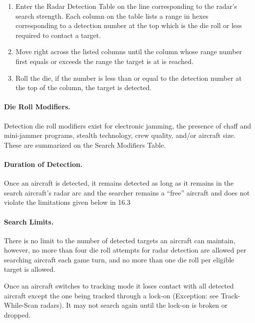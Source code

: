 \begin{enumerate}
    \item Enter the Radar Detection Table on the line corresponding to the radar's search strength. Each column on the table lists a range in hexes corresponding to a detection number at the top which is the die roll or less required to contact a target.
    \item Move right across the listed columns until the column whose range number first equals or exceeds the range the target is at is reached.
    \item Roll the die, if the number is less than or equal to the detection number at the top of the column, the target is detected.
\end{enumerate}

\paragraph{Die Roll Modifiers.} Detection die roll modifiers exist for electronic jamming, the presence of chaff and mini-jammer programs, stealth technology, crew quality, and/or aircraft size. These are summarized on the Search Modifiers Table.

\paragraph{Duration of Detection.} Once an aircraft is detected, it remains detected as long as it remains in the search aircraft's radar arc and the searcher remains a “free” aircraft and does not violate the limitations given below in 16.3

\paragraph{Search Limits.} There is no limit to the number of detected targets an aircraft can maintain, however, no more than four die roll attempts for radar detection are allowed per searching aircraft each game turn, and no more than one die roll per eligible target is allowed.

Once an aircraft switches to tracking mode it loses contact with all detected aircraft except the one being tracked through a lock-on (Exception: see Track-While-Scan radars). It may not search again until the lock-on is broken or dropped. 

